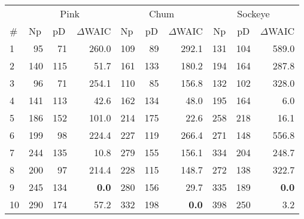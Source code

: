 \begin{tabular}{lrrrrrrrrr}
  \hline
  \multicolumn{1}{r}{} &
            \multicolumn{3}{c}{Pink} &
            \multicolumn{3}{c}{Chum} &
            \multicolumn{3}{c}{Sockeye} \\ 
  \cmidrule(lr){2-4} \cmidrule(lr){5-7} \cmidrule(lr){8-10} 
  \multicolumn{1}{l}{\#} & 
    \multicolumn{1}{l}{Np} & 
    \multicolumn{1}{l}{pD} & 
    \multicolumn{1}{l}{$\Delta$WAIC} & 
    \multicolumn{1}{l}{Np} & 
    \multicolumn{1}{c}{pD} & 
    \multicolumn{1}{c}{$\Delta$WAIC} & 
    \multicolumn{1}{c}{Np} & 
    \multicolumn{1}{c}{pD} & 
    \multicolumn{1}{l}{$\Delta$WAIC} \\ 
  \cmidrule{1-10} 
1 & 95 & 71 & 260.0 & 109 & 89 & 292.1 & 131 & 104 & 589.0 \\ 
  2 & 140 & 115 & 51.7 & 161 & 133 & 180.2 & 194 & 164 & 287.8 \\ 
  3 & 96 & 71 & 254.1 & 110 & 85 & 156.8 & 132 & 102 & 328.0 \\ 
  4 & 141 & 113 & 42.6 & 162 & 134 & 48.0 & 195 & 164 & 6.0 \\ 
  5 & 186 & 152 & 101.0 & 214 & 175 & 22.6 & 258 & 218 & 16.1 \\ 
  6 & 199 & 98 & 224.4 & 227 & 119 & 266.4 & 271 & 148 & 556.8 \\ 
  7 & 244 & 135 & 10.8 & 279 & 155 & 156.1 & 334 & 204 & 248.7 \\ 
  8 & 200 & 97 & 214.4 & 228 & 115 & 148.7 & 272 & 138 & 322.7 \\ 
  9 & 245 & 134 & \textbf{0.0} & 280 & 156 & 29.7 & 335 & 189 & \textbf{0.0} \\ 
  10 & 290 & 174 & 57.2 & 332 & 198 & \textbf{0.0} & 398 & 250 & 3.2 \\ 
   \hline
\end{tabular}
